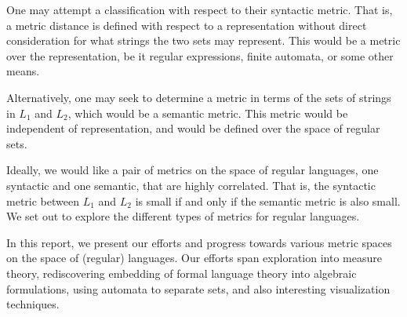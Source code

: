 One may attempt a classification with respect to their syntactic metric.
That is, a metric distance is defined with respect to a representation
without direct consideration for what strings the two sets may represent.
This would be a metric over the representation, be it regular
expressions, finite automata, or some other means.

Alternatively, one may seek to determine a metric in terms of
the sets of strings in \(L_1\) and \(L_2\), which would be a semantic metric.
This metric would be independent of representation,
and would be defined over the space of regular sets.

Ideally, we would like a pair of metrics on the space of regular languages,
one syntactic and one semantic,
that are highly correlated.
That is, the syntactic metric between \(L_1\) and \(L_2\) is small
if and only if the semantic metric is also small.
We set out to explore the different types of metrics for regular languages.

In this report,
we present our efforts and progress towards various metric spaces
on the space of (regular) languages.
Our efforts span exploration into measure theory,
rediscovering embedding of formal language theory into algebraic formulations,
using automata to separate sets,
and also interesting visualization techniques.



